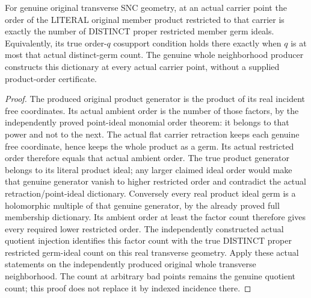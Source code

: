 \begin{theorem}
\label{hir:sharp-original-member-product-order-distinct-trace-count}
\leanok
For genuine original transverse SNC geometry, at an actual carrier
point the order of the LITERAL original member product restricted to
that carrier is exactly the number of DISTINCT proper restricted member
germ ideals. Equivalently, its true order-$q$ cosupport condition holds
there exactly when $q$ is at most that actual distinct-germ count. The
genuine whole neighborhood producer constructs this dictionary at every
actual carrier point, without a supplied product-order certificate.
\end{theorem}
\begin{proof}
The produced original product generator is the product of its real
incident free coordinates. Its actual ambient order is the number of
those factors, by the independently proved point-ideal monomial order
theorem: it belongs to that power and not to the next. The actual flat
carrier retraction keeps each genuine free coordinate, hence keeps the
whole product as a germ. Its actual restricted order therefore equals
that actual ambient order. The true product generator belongs to its
literal product ideal; any larger claimed ideal order would make that
genuine generator vanish to higher restricted order and contradict the
actual retraction/point-ideal dictionary. Conversely every real product
ideal germ is a holomorphic multiple of that genuine generator, by the
already proved full membership dictionary. Its ambient order at least
the factor count therefore gives every required lower restricted order.
The independently constructed actual quotient injection identifies
this factor count with the true DISTINCT proper restricted germ-ideal
count on this real transverse geometry. Apply these actual statements
on the independently produced original whole transverse neighborhood.
The count at arbitrary bad points remains the genuine quotient count;
this proof does not replace it by indexed incidence there.
\end{proof}

